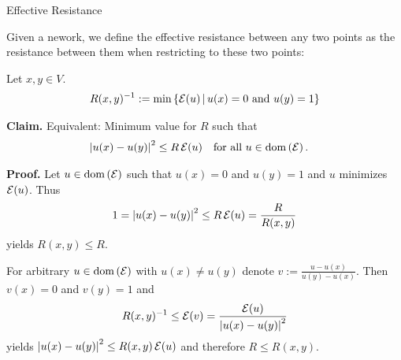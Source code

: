 \begin{frame}[allowframebreaks=.95]{Effective Resistance}
    
    Given a nework, we define the effective resistance between any two points as the resistance between them when restricting to these two points:
    
    \begin{definition}
    Let $x,y \in V$.
        \begin{align*}
            R(x,y)^{-1} := \min \left\{ \mathcal{E}(u) \,\middle\vert\, u(x)=0 \text{ and } u(y)=1 \right\} 
        \end{align*}
    \end{definition}
    \bigskip

    \textbf{Claim.} Equivalent: Minimum value for $R$ such that
    \begin{align*}
        \left\vert u(x) - u(y) \right\vert^{2} &\leq R\, \mathcal{E}(u) && \text{for all } u \in \mathrm{dom}\left( \mathcal{E} \right).
    \end{align*}
    \bigskip
    \newpage
    
    \textbf{Proof.} Let $u\in \mathrm{dom}\left( \mathcal{E} \right)$ such that $u(x)=0$ and $u(y)=1$ and $u$ minimizes $\mathcal{E}(u)$. Thus
    \begin{align*}
        1 = \left\vert u(x) - u(y) \right\vert^{2} \leq R\, \mathcal{E}(u) = \frac{R}{R(x,y)}
    \end{align*}
    yields $R(x,y) \leq R$.

    For arbitrary $u \in \mathrm{dom}\left( \mathcal{E} \right)$ with $u(x) \neq u(y)$ denote $v := \frac{u - u(x)}{u(y)-u(x)}$.
    Then $v(x)=0$ and $v(y)=1$ and
    \begin{align*}
        R(x,y)^{-1} \leq \mathcal{E}(v) = \frac{\mathcal{E}(u)}{\left\vert u(x)-u(y) \right\vert^{2}}
    \end{align*}
    yields $\left\vert u(x)-u(y) \right\vert^{2} \leq R(x,y)\,\mathcal{E}(u)$ and therefore $R \leq R(x,y)$.
\end{frame}

